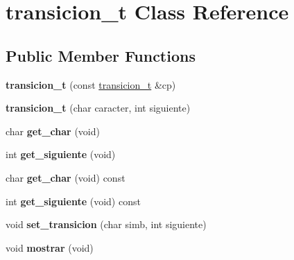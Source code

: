 \hypertarget{classtransicion__t}{\section{transicion\-\_\-t Class Reference}
\label{classtransicion__t}
}
\subsection*{Public Member Functions}
\begin{DoxyCompactItemize}
\item 
\hypertarget{classtransicion__t_ad189c5587e9592a91267fa30029bb67e}{{\bfseries transicion\-\_\-t} (const \hyperlink{classtransicion__t}{transicion\-\_\-t} \&cp)}\label{classtransicion__t_ad189c5587e9592a91267fa30029bb67e}

\item 
\hypertarget{classtransicion__t_a08b2031d3acb6ad17957631e94a3db17}{{\bfseries transicion\-\_\-t} (char caracter, int siguiente)}\label{classtransicion__t_a08b2031d3acb6ad17957631e94a3db17}

\item 
\hypertarget{classtransicion__t_a16d60e18df31eaad272fde4c02472e6a}{char {\bfseries get\-\_\-char} (void)}\label{classtransicion__t_a16d60e18df31eaad272fde4c02472e6a}

\item 
\hypertarget{classtransicion__t_afda218eac35a096776b10eeb3418d9f5}{int {\bfseries get\-\_\-siguiente} (void)}\label{classtransicion__t_afda218eac35a096776b10eeb3418d9f5}

\item 
\hypertarget{classtransicion__t_afbcac7df5216eceeca3843a5277d78ec}{char {\bfseries get\-\_\-char} (void) const }\label{classtransicion__t_afbcac7df5216eceeca3843a5277d78ec}

\item 
\hypertarget{classtransicion__t_a9715167b795e800bd54a91a99f0fc0a5}{int {\bfseries get\-\_\-siguiente} (void) const }\label{classtransicion__t_a9715167b795e800bd54a91a99f0fc0a5}

\item 
\hypertarget{classtransicion__t_ab064f7e3c5aefaba742e424d9cf0568a}{void {\bfseries set\-\_\-transicion} (char simb, int siguiente)}\label{classtransicion__t_ab064f7e3c5aefaba742e424d9cf0568a}

\item 
\hypertarget{classtransicion__t_a04fdc0e8b5fcb241d7472d4abe384a9a}{void {\bfseries mostrar} (void)}\label{classtransicion__t_a04fdc0e8b5fcb241d7472d4abe384a9a}


\end{DoxyCompactItemize}
